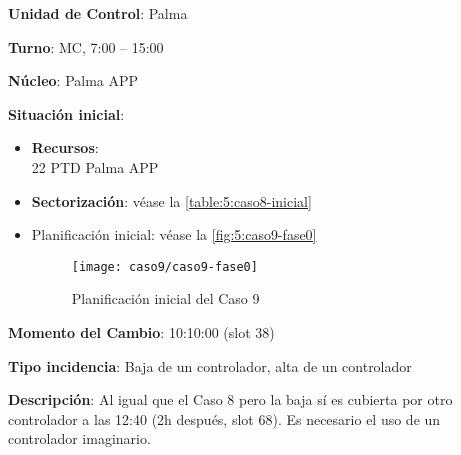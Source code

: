 \textbf{Unidad de Control}: Palma

\textbf{Turno}: MC, 7:00 -- 15:00

\textbf{Núcleo}: Palma APP

\textbf{Situación inicial}:
\begin{itemize}[label={}]
	
	\item \textbf{Recursos}: \\
	22 PTD Palma APP \\
	
	\item \textbf{Sectorización}: véase la \autoref{table:5:caso8-inicial}
	
	\item Planificación inicial: véase la \autoref{fig:5:caso9-fase0}
	
	\begin{figure}[!h]
		\centering
		\texttt{[image: caso9/caso9-fase0]}
		\caption{Planificación inicial del Caso 9}
		\label{fig:5:caso9-fase0}
	\end{figure}
	
\end{itemize}

\textbf{Momento del Cambio}: 10:10:00 (slot 38)

\textbf{Tipo incidencia}: Baja de un controlador, alta de un controlador

\textbf{Descripción}: Al igual que el Caso 8 pero la baja sí es cubierta por otro controlador a las 12:40 (2h después, slot 68). Es necesario el uso de un controlador imaginario.